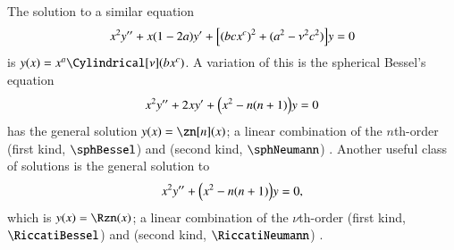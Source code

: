 









The solution to a similar equation%
\begin{equation}
    x^2y'' + x{(1-2a)}y'+ {\left[  {(bcx^{c})}^2 + {(a^2-\nu^2 c^2)}  \right]}y = 0
\end{equation}
is $y(x) = x^a \Cylindrical[\nu](bx^c)$. %
A variation of this is the spherical Bessel's equation
\begin{equation}
    x^2 y'' + 2x y' + {\left(  x^2 - n(n+1)  \right)}y = 0
\end{equation}
has the general solution $y(x)=\zn[n](x)$; a linear combination of the $n$th-order  (first kind, $\sphBessel$) and  (second kind, $\sphNeumann$) .
Another useful class of solutions is the general solution to
\begin{equation}
    x^2 y'' + {\left(  x^2 - n(n+1)  \right)}y = 0,
\end{equation}
which is $y(x)= \Rzn(x)$; a linear combination of the $\nu$th-order  (first kind, $\RiccatiBessel$) and  (second kind, $\RiccatiNeumann$) .




